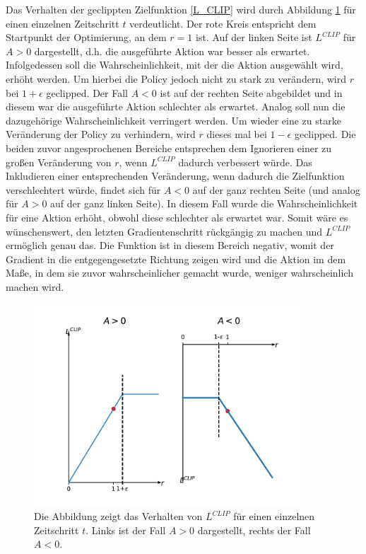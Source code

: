 Das Verhalten der geclippten Zielfunktion \eqref{L_CLIP} wird durch Abbildung \ref{fig_L_clip} für einen einzelnen Zeitschritt $t$ verdeutlicht. Der rote Kreis entspricht dem Startpunkt der Optimierung, an dem $r = 1$ ist. Auf der linken Seite ist $L^{CLIP}$ für $A > 0$ dargestellt, d.h. die ausgeführte Aktion war besser als erwartet. Infolgedessen soll die Wahrscheinlichkeit, mit der die Aktion ausgewählt wird, erhöht werden. Um hierbei die Policy jedoch nicht zu stark zu verändern, wird $r$ bei $1+\epsilon$ geclipped. Der Fall $A < 0$ ist auf der rechten Seite abgebildet und in diesem war die ausgeführte Aktion schlechter als erwartet. Analog soll nun die dazugehörige Wahrscheinlichkeit verringert werden. Um wieder eine zu starke Veränderung der Policy zu verhindern, wird $r$ dieses mal bei $1-\epsilon$ geclipped. Die beiden zuvor angesprochenen Bereiche entsprechen dem Ignorieren einer zu großen Veränderung von $r$, wenn $L^{CLIP}$ dadurch verbessert würde. Das Inkludieren einer entsprechenden Veränderung, wenn dadurch die Zielfunktion verschlechtert würde, findet sich für $A < 0$ auf der ganz rechten Seite (und analog für $A > 0$ auf der ganz linken Seite). In diesem Fall wurde die Wahrscheinlichkeit für eine Aktion erhöht, obwohl diese schlechter als erwartet war. Somit wäre es wünschenswert, den letzten Gradientenschritt rückgängig zu machen und $L^{CLIP}$ ermöglich genau das. Die Funktion ist in diesem Bereich negativ, womit der Gradient in die entgegengesetzte Richtung zeigen wird und die Aktion im dem Maße, in dem sie zuvor wahrscheinlicher gemacht wurde, weniger wahrscheinlich machen wird.

\begin{figure}[ht!]
  \centering
  \includegraphics[height=0.5\textwidth, width=0.9\textwidth]{abbildungen/L_clip.pdf}
  \caption{Die Abbildung zeigt das Verhalten von $L^{CLIP}$ für einen einzelnen Zeitschritt $t$. Links ist der Fall $A > 0$ dargestellt, rechts der Fall $A < 0$.}
  \label{fig_L_clip}
\end{figure}

